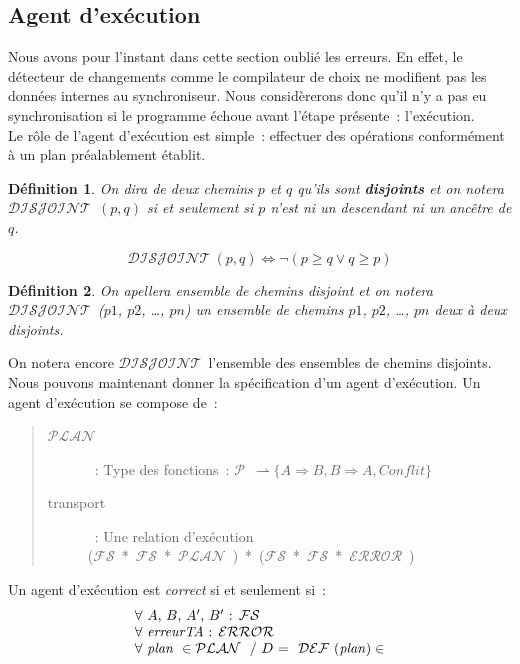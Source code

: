 \documentclass[11pt]{report}
\newtheorem{defi}{D\'efinition}
\newcommand{\Conflit}{\ensuremath{\mathit{Conflit}}}
\newcommand{\fs}{\ensuremath{\mathcal{FS}}}
\newcommand{\error}{\ensuremath{\mathcal{ERROR}}}
\newcommand{\plan}{\ensuremath{\mathcal{PLAN}}}
\newcommand{\ddef}{\ensuremath{\mathcal{DEF}}}
\newcommand{\disjoint}{\ensuremath{\mathcal{DISJOINT}}}
\newcommand{\path}{\ensuremath{\mathcal{P}}}
\begin{document}
{\subsection{Agent d'ex\'ecution}
Nous avons pour l'instant dans cette section oubli\'e les erreurs. En effet,
le d\'etecteur de changements comme le compilateur de choix ne modifient 
pas les donn\'ees internes au synchroniseur. Nous consid\`ererons donc 
qu'il n'y a pas eu synchronisation si le programme \'echoue avant l'\'etape 
pr\'esente~: l'ex\'ecution.\\
Le r\^ole de l'agent d'ex\'ecution est simple~: effectuer des op\'erations conform\'ement
\`a un plan pr\'ealablement \'etablit.\\
\begin{defi}
On dira de deux chemins $p$ et $q$ qu'ils sont \textbf{disjoints} et on 
notera \disjoint\ $(p, q)$ si et seulement si $p$ n'est ni un descendant ni 
un anc\^etre de $q$.
\end{defi}
\begin{equation}
\disjoint\ (p, q) \Leftrightarrow \neg(p \geq q \vee q \geq p)
\end{equation}
\begin{defi}
On apellera ensemble de chemins disjoint et on notera \disjoint\ 
($p1$, $p2$, \ldots, $pn$)
un ensemble de chemins $p1$, $p2$, \ldots, $pn$ deux \`a deux disjoints.
\end{defi}
On notera encore \disjoint\ l'ensemble des ensembles de chemins disjoints.\\
Nous pouvons maintenant donner la sp\'ecification d'un agent d'ex\'ecution.
Un agent d'ex\'ecution se compose de~: 
\begin{quote}
 \begin{description}
  \item [\plan\ ]~: Type des fonctions~: \path\ $\rightharpoonup \{ A \Rightarrow B, B \Rightarrow A, 
  \Conflit \}$
  \item [transport]~: Une relation d'ex\'ecution\\
 \mbox{(\fs\ * \fs\ * \plan\ ) * (\fs\ * \fs\ * \error\ ) }
 \end{description}
\end{quote}
Un agent d'ex\'ecution est \emph{correct} si et seulement si~:
\[
\begin{array}{l}
\forall \mbox{\ $A$, $B$, $A'$, $B'$~: \fs\ }\\
\forall \mbox{\ $\mathit{erreurTA}$~: \error\ }\\
\forall \mbox{\ $\mathit{plan}$ } \in \plan\ \mbox{\ / $D$ = \ } \ddef\ (\mathit{plan}) \in

\end{array}\]}
\end{document}

